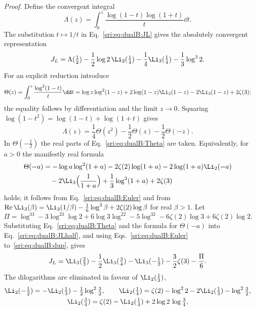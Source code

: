 \emph{Proof.} Define the convergent integral
\begin{equation}
 \Lambda(z)=\int_0^z\frac{\log(1-t)\log(1+t)}{t}\dd t.
\end{equation}
The substitution $t\mapsto1/t$ in Eq.~\eqref{sri:eq:dualB:JL} gives the absolutely convergent representation
\begin{equation}
 J_L=\Lambda(\tfrac12)-\frac12\log2\,\Li_2(\tfrac14)-\frac14\Li_3(\tfrac14)-\frac13\log^32.
 \label{sri:eq:dualB:JLhalf}
\end{equation}
For an explicit reduction introduce
\begin{equation}
 \Theta(z)=\int_0^z\frac{\log^2(1-t)}{t}\dd t=\log z\log^2(1-z)+2\log(1-z)\Li_2(1-z)-2\Li_3(1-z)+2\zeta(3);
 \label{sri:eq:dualB:Theta}
\end{equation}
the equality follows by differentiation and the limit $z\to0$. Squaring $\log(1-t^2)=\log(1-t)+\log(1+t)$ gives
\begin{equation}
 \Lambda(z)=\frac14\Theta(z^2)-\frac12\Theta(z)-\frac12\Theta(-z).
\end{equation}
In $\Theta(-\frac12)$ the real parts of Eq.~\eqref{sri:eq:dualB:Theta} are taken. Equivalently, for $a>0$ the manifestly
real formula
\begin{equation}
\begin{aligned}
 \Theta(-a)&=-\log a\log^2(1+a)-2\zeta(2)\log(1+a)-2\log(1+a)\Li_2(-a)\\
 &\quad-2\Li_3\Bigl(\frac1{1+a}\Bigr)+\frac13\log^3(1+a)+2\zeta(3)
\end{aligned}
\end{equation}
holds; it follows from Eq.~\eqref{sri:eq:dualB:Euler} and from
$\operatorname{Re}\Li_3(\beta)=\Li_3(1/\beta)-\frac16\log^3\beta+2\zeta(2)\log\beta$ for real $\beta>1$. Let
\begin{equation}
 \Pi=\log^33-3\log^23\log2+6\log3\log^22-5\log^32-6\zeta(2)\log3+6\zeta(2)\log2.
\end{equation}
Substituting Eq.~\eqref{sri:eq:dualB:Theta} and the formula for $\Theta(-a)$ into Eq.~\eqref{sri:eq:dualB:JLhalf}, and using
Eqs.~\eqref{sri:eq:dualB:Euler} to~\eqref{sri:eq:dualB:dup}, gives
\begin{equation}
 J_L=\Li_3(\tfrac23)-\frac12\Li_3(\tfrac34)-\Li_3(-\tfrac12)-\frac32\zeta(3)-\frac\Pi6.
 \label{sri:eq:dualB:JLreduced}
\end{equation}
The dilogarithms are eliminated in favour of $\Li_2(\frac13)$,
\begin{equation}
\begin{gathered}
 \Li_2(-\tfrac12)=-\Li_2(\tfrac13)-\tfrac12\log^2\tfrac32,\qquad
 \Li_2(\tfrac14)=\zeta(2)-\log^22-2\Li_2(\tfrac13)-\log^2\tfrac32,\\
 \Li_2(\tfrac34)=\zeta(2)-\Li_2(\tfrac14)+2\log2\,\log\tfrac34,
\end{gathered}
\end{equation}
